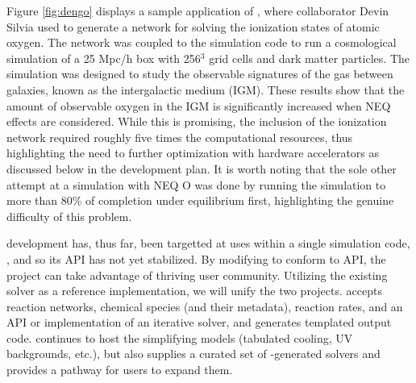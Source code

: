 Figure \ref{fig:dengo} displays a sample application of \dengo{}, where
collaborator Devin Silvia used \dengo{} to generate a network for solving
the ionization states of atomic oxygen.  The network was coupled to
the \enzo{} simulation code to run a cosmological simulation of a 25
Mpc/h box with 256$^{3}$ grid cells and dark matter particles.  The
simulation was designed to study the observable signatures of the gas
between galaxies, known as the intergalactic medium (IGM).  These
results show that the amount of observable oxygen in the IGM is
significantly increased when NEQ effects are considered.
While this is promising, the inclusion of the ionization network
required roughly five times the computational resources, thus
highlighting the need to further optimization with hardware
accelerators as discussed below in the development plan.  It is worth
noting that the sole other attempt at a simulation with NEQ
O \citep{2016MNRAS.460.2157O} was done by running the
simulation to more than 80\% of completion under equilibrium first,
highlighting the genuine difficulty of this problem.

\dengo{} development has, thus far, been targetted at uses within a
single simulation code, \enzo{}, and so its API has not yet
stabilized.  By modifying \dengo{} to conform to  API, the
\dengo{} project can take advantage of  thriving user
community. Utilizing the existing \grackle{}
solver as a reference implementation, we will unify the two projects.
\dengo{} accepts reaction networks, chemical species (and their
metadata), reaction rates, and an API or implementation of an
iterative solver, and generates templated output code.  \grackle{}
continues to host the simplifying models (tabulated cooling, UV
backgrounds, etc.), but also supplies a curated set of
\dengo{}-generated solvers and provides a pathway for users to expand
them.

